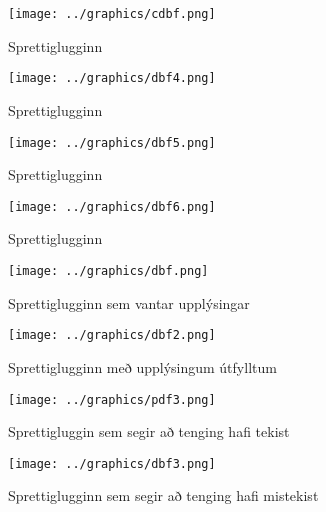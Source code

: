 \documentclass[12pt, git, final]{rureport}
\begin{document}
\begin{figure}
	\centering 
	\texttt{[image: ../graphics/cdbf.png]}
	\caption{Sprettiglugginn \label{fig:cdbf}}
\end{figure}

\begin{figure}
	\centering 
	\texttt{[image: ../graphics/dbf4.png]}
	\caption{Sprettiglugginn \label{fig:dbf4}}
\end{figure}

\begin{figure}
	\centering 
	\texttt{[image: ../graphics/dbf5.png]}
	\caption{Sprettiglugginn \label{fig:dbf5}}
\end{figure}

\begin{figure}
	\centering 
	\texttt{[image: ../graphics/dbf6.png]}
	\caption{Sprettiglugginn\label{fig:dbf6}}
\end{figure}

\begin{figure}
	\centering 
	\texttt{[image: ../graphics/dbf.png]}
	\caption{Sprettiglugginn sem vantar upplýsingar  \label{fig:dbf}}
\end{figure}

\begin{figure}
	\centering 
	\texttt{[image: ../graphics/dbf2.png]}
	\caption{Sprettiglugginn með upplýsingum útfylltum \label{fig:dbf2}}
\end{figure}

\begin{figure}
	\centering 
	\texttt{[image: ../graphics/pdf3.png]}
	\caption{Sprettigluggin sem segir að tenging hafi tekist \label{fig:pdf3}}
\end{figure}

\begin{figure}
	\centering 
	\texttt{[image: ../graphics/dbf3.png]}
	\caption{Sprettiglugginn sem segir að tenging hafi mistekist \label{fig:dbf3}}
\end{figure}



\clearpage
\printbibliography
\end{document}
